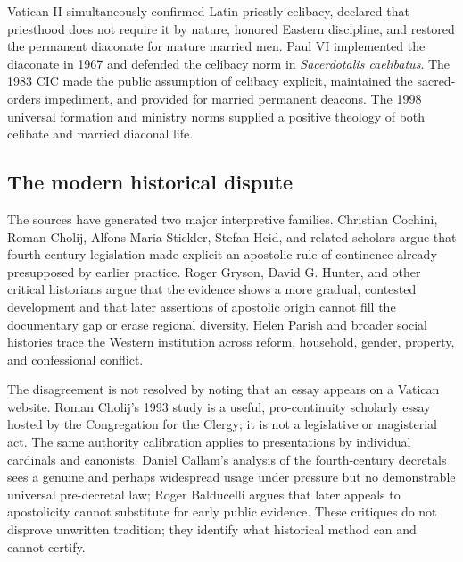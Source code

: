Vatican II simultaneously confirmed Latin priestly celibacy, declared that priesthood does not require it by nature, honored Eastern discipline, and restored the permanent diaconate for mature married men. Paul VI implemented the diaconate in 1967 and defended the celibacy norm in \emph{Sacerdotalis caelibatus}. The 1983 CIC made the public assumption of celibacy explicit, maintained the sacred-orders impediment, and provided for married permanent deacons. The 1998 universal formation and ministry norms supplied a positive theology of both celibate and married diaconal life.

\subsection{The modern historical dispute}

The sources have generated two major interpretive families. Christian Cochini, Roman Cholij, Alfons Maria Stickler, Stefan Heid, and related scholars argue that fourth-century legislation made explicit an apostolic rule of continence already presupposed by earlier practice. Roger Gryson, David G. Hunter, and other critical historians argue that the evidence shows a more gradual, contested development and that later assertions of apostolic origin cannot fill the documentary gap or erase regional diversity. Helen Parish and broader social histories trace the Western institution across reform, household, gender, property, and confessional conflict.

The disagreement is not resolved by noting that an essay appears on a Vatican website. Roman Cholij's 1993 study is a useful, pro-continuity scholarly essay hosted by the Congregation for the Clergy; it is not a legislative or magisterial act. The same authority calibration applies to presentations by individual cardinals and canonists. Daniel Callam's analysis of the fourth-century decretals sees a genuine and perhaps widespread usage under pressure but no demonstrable universal pre-decretal law; Roger Balducelli argues that later appeals to apostolicity cannot substitute for early public evidence. These critiques do not disprove unwritten tradition; they identify what historical method can and cannot certify.

